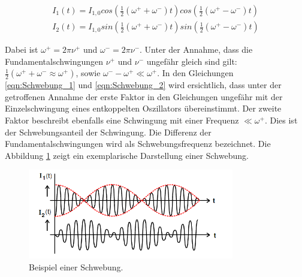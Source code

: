 \begin{align}
  \label{eqn:Schwebung_1}
  I_1(t) = I_{1,0}cos\left(\frac{1}{2}\left(\omega^+ + \omega^-\right)t\right)cos\left(\frac{1}{2}\left(\omega^+-\omega^-\right)t\right)\\
  \label{eqn:Schwebung_2}
  I_2(t) = I_{1,0}sin\left(\frac{1}{2}\left(\omega^+ + \omega^-\right)t\right)sin\left(\frac{1}{2}\left(\omega^+-\omega^-\right)t\right)
\end{align}

Dabei ist $\omega^+ = 2\pi\nu^+$ und $\omega^- = 2\pi\nu^-$.
Unter der Annahme, dass die Fundamentalschwingungen $\nu^+$ und $\nu^-$ ungefähr
gleich sind gilt:$\frac{1}{2}(\omega^++\omega^-\approx\omega^+)$, sowie
$\omega^- - \omega^+ \ll\omega^+$.
In den Gleichungen \eqref{eqn:Schwebung_1} und \eqref{eqn:Schwebung_2} wird
ersichtlich, dass unter der getroffenen Annahme der erste Faktor in den Gleichungen
ungefähr mit der Einzelschwingung eines entkoppelten Oszillators übereinstimmt.
Der zweite Faktor beschreibt ebenfalls eine Schwingung mit einer Frequenz
$\ll\omega^+$. Dies ist der Schwebungsanteil der Schwingung.
Die Differenz der Fundamentalschwingungen wird als Schwebungsfrequenz
bezeichnet. Die Abbildung \ref{fig:Schwebung} zeigt ein exemplarische Darstellung
einer Schwebung.

\begin{figure}
  \centering
  \includegraphics[width=9cm]{V355_Schwebung.png}
  \caption{Beispiel einer Schwebung.\cite{anleitung01}\protect}
  \label{fig:Schwebung}
\end{figure}




